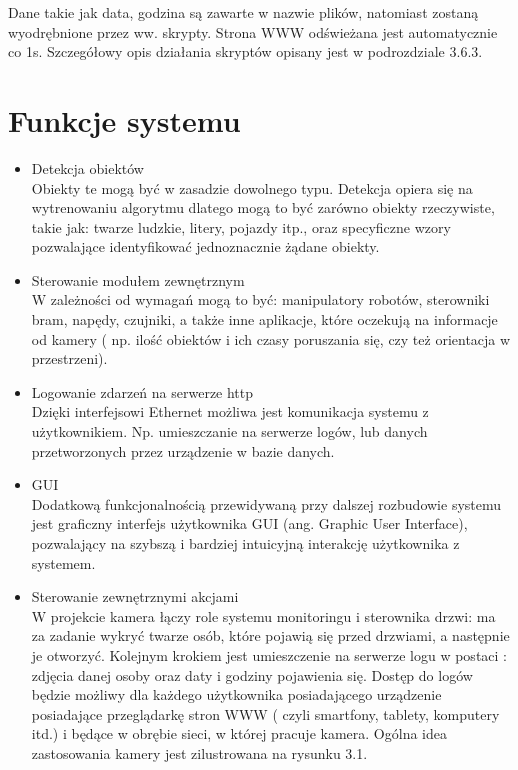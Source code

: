 Dane takie jak data, godzina są zawarte w nazwie plików, natomiast zostaną wyodrębnione przez ww. skrypty. Strona WWW odświeżana jest automatycznie  co 1s.  Szczegółowy opis działania skryptów opisany jest w podrozdziale 3.6.3.

\section{Funkcje systemu}

\begin{itemize}[noitemsep]
\item Detekcja obiektów \\
Obiekty te mogą być w zasadzie dowolnego typu. Detekcja opiera się na wytrenowaniu algorytmu dlatego mogą to być zarówno obiekty rzeczywiste, takie jak: twarze ludzkie, litery, pojazdy itp., oraz specyficzne wzory pozwalające identyfikować jednoznacznie żądane obiekty.

\item Sterowanie modułem zewnętrznym \\
W zależności od wymagań mogą to być: manipulatory robotów, sterowniki bram, napędy, czujniki, a także inne aplikacje, które oczekują na informacje od kamery ( np. ilość obiektów i ich czasy poruszania się, czy też orientacja w przestrzeni).

\item Logowanie zdarzeń na serwerze http \\
Dzięki interfejsowi Ethernet możliwa jest komunikacja systemu z użytkownikiem. Np. umieszczanie na serwerze logów, lub danych przetworzonych przez urządzenie w bazie danych. 

\item GUI \\ 
Dodatkową funkcjonalnością przewidywaną przy dalszej rozbudowie systemu jest graficzny interfejs użytkownika GUI (ang. Graphic User Interface), pozwalający na szybszą i  bardziej intuicyjną interakcję użytkownika z systemem.

\item Sterowanie zewnętrznymi akcjami \\
W projekcie kamera łączy role systemu monitoringu i sterownika drzwi:  ma za zadanie wykryć twarze osób, które pojawią się przed drzwiami, a następnie je otworzyć. Kolejnym krokiem jest umieszczenie  na serwerze logu w postaci : zdjęcia danej osoby oraz daty i godziny pojawienia się. Dostęp do logów będzie możliwy dla każdego użytkownika posiadającego urządzenie posiadające przeglądarkę stron WWW ( czyli smartfony, tablety, komputery itd.) i będące w obrębie sieci, w której pracuje kamera.
Ogólna idea zastosowania kamery jest zilustrowana na rysunku 3.1.
\end{itemize}

